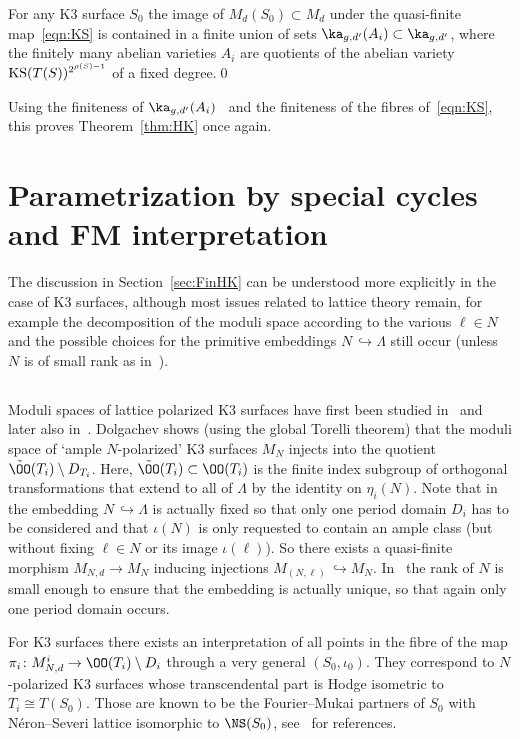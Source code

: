 \begin{coro}
For any K3 surface $S_0$ the image of $M_d(S_0)\subset M_d$ under the quasi-finite map~\eqref{eqn:KS} is contained in a finite union of sets $\ka_{g,d'}(A_i)\subset \ka_{g,d'}$, where the finitely many abelian varieties $A_i$ are quotients of the abelian variety ${\rm KS}(T(S))^{2^{\rho(S)-1}}$ of a fixed degree.\qed
\end{coro}

Using the finiteness of $\ka_{g,d'}(A_i)$~\cite{NarNor} and the finiteness of the fibres of~\eqref{eqn:KS}, this proves Theorem~\ref{thm:HK} once again.


\section{Parametrization by special cycles and FM interpretation}\label{sec:paraFM}

The discussion in Section~\ref{sec:FinHK} can be understood more explicitly in the case of K3 surfaces, although most issues related to lattice theory remain, for example the decomposition of the moduli space according to the various $\ell\in N$ and the possible choices for the primitive embeddings $N\,\hookrightarrow \Lambda$ still occur (unless $N$ is of small rank as in~\cite{Beauv}).

\subsection{}
Moduli spaces of lattice polarized K3 surfaces have first been studied in~\cite{Dolg} and later also in~\cite{Beauv}. Dolgachev shows (using the global Torelli theorem) that the moduli space of `ample $N$-polarized' K3 surfaces $M_N$ injects into the quotient $\tilde \OO(T_i)\setminus D_{T_i}$. Here, $\tilde\OO(T_i)\subset\OO(T_i)$ is the finite index subgroup of orthogonal transformations that extend to all of $\Lambda$ by the identity on $\eta_i(N)$. Note that in~\cite{Dolg} the embedding $N\,\hookrightarrow \Lambda$ is actually fixed so that only one period domain $D_i$ has to be considered and that $\iota(N)$ is only requested to contain an ample class (but without fixing $\ell\in N$ or its image $\iota(\ell)$). So there exists a quasi-finite morphism $M_{N,d}\to M_N$ inducing injections $M_{(N,\ell)}\,\hookrightarrow M_N$. In~\cite{Beauv} the rank of $N$ is small enough to ensure that the embedding is actually unique, so that again only one period domain occurs.

For K3 surfaces there exists an interpretation of all points in the fibre of the map $\pi_i\colon M^i_{N,d}\to \OO(T_i)\setminus D_i$ through a very general $(S_0,\iota_0)$. They correspond to $N$-polarized K3 surfaces whose transcendental part is Hodge isometric to $T_i\cong T(S_0)$. Those are known to be the Fourier--Mukai partners of $S_0$ with N\'eron--Severi lattice isomorphic to $\NS(S_0)$, see~\cite[Chapter~16]{HuyK3} for references.

